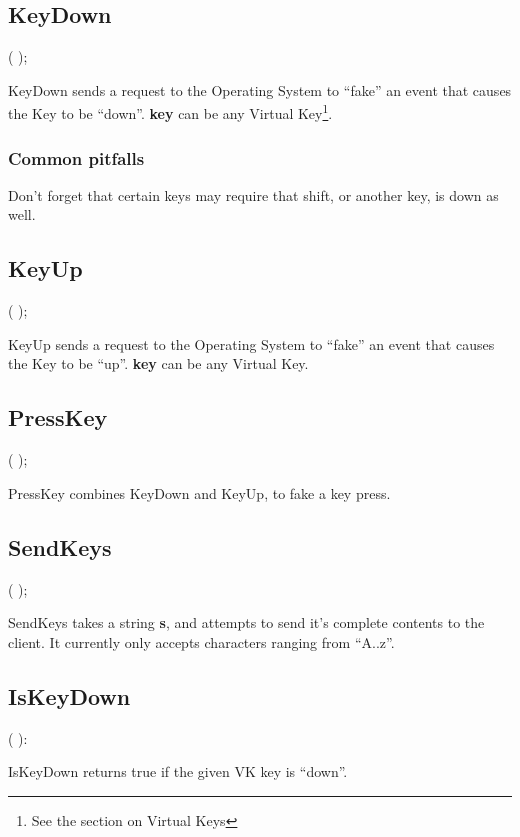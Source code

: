 \documentclass[a4paper]{report}
\begin{document}
\subsection{KeyDown}

\pproc {}( );

KeyDown sends a request to the Operating System to ``fake'' an event that
causes the Key to be ``down''.
\textbf{key} can be any Virtual Key\footnote{See the section on Virtual Keys}.

\subsubsection{Common pitfalls}

Don't forget that certain keys may require that shift, or another key,
is down as well.

\subsection{KeyUp}
\pproc {}( );

KeyUp sends a request to the Operating System to ``fake'' an event that
causes the Key to be ``up''.
\textbf{key} can be any Virtual Key.

\subsection{PressKey}

\pproc {}( );

PressKey combines KeyDown and KeyUp, to fake a key press.

\subsection{SendKeys}

\pproc {}( );

SendKeys takes a string \textbf{s}, and attempts to send it's complete contents to
the client. It currently only accepts characters ranging from ``A..z''.

\subsection{IsKeyDown}
\pfunc {}( ): 

IsKeyDown returns true if the given VK key is ``down''.
\end{document}

